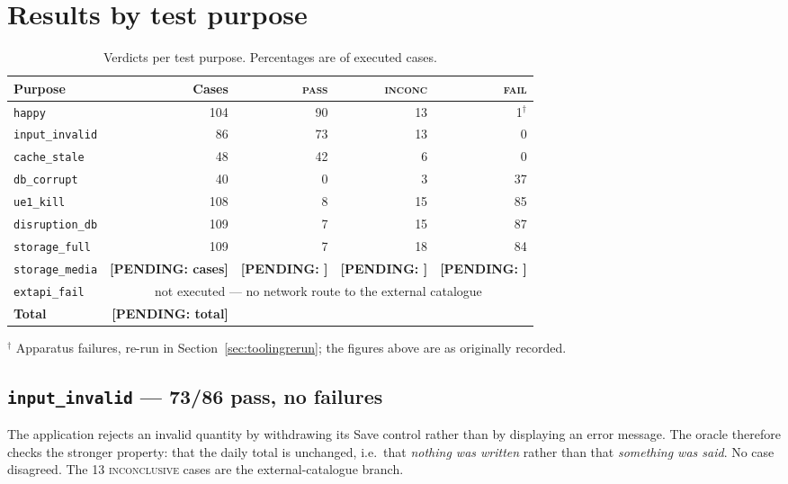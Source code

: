 \documentclass[11pt,a4paper]{article}
\newcommand{\PENDING}[1]{\textcolor{warn}{\textbf{[PENDING: #1]}}}
\newcommand{\gate}[1]{\texttt{\small #1}}
\begin{document}
\section{Results by test purpose}
\label{sec:results}

\begin{table}[h]
\centering\small
\caption{Verdicts per test purpose. Percentages are of executed cases.}
\label{tab:results}
\begin{tabular}{@{}lrrrr@{}}
\toprule
Purpose & Cases & \textsc{pass} & \textsc{inconc} & \textsc{fail} \\
\midrule
\gate{happy}          & 104 & 90 & 13 & 1$^{\dagger}$ \\
\gate{input\_invalid} &  86 & 73 & 13 & 0 \\
\gate{cache\_stale}   &  48 & 42 &  6 & 0 \\
\gate{db\_corrupt}    &  40 &  0 &  3 & 37 \\
\gate{ue1\_kill}      & 108 &  8 & 15 & 85 \\
\gate{disruption\_db} & 109 &  7 & 15 & 87 \\
\gate{storage\_full}  & 109 &  7 & 18 & 84 \\
\gate{storage\_media} & \PENDING{cases} & \PENDING{} & \PENDING{} & \PENDING{} \\
\gate{extapi\_fail}   & \multicolumn{4}{c}{not executed --- no network route to the external catalogue} \\
\midrule
\textbf{Total}        & \PENDING{total} & & & \\
\bottomrule
\end{tabular}
\end{table}

\noindent $^{\dagger}$ Apparatus failures, re-run in
Section~\ref{sec:toolingrerun}; the figures above are as originally recorded.

\subsection{\gate{input\_invalid} --- 73/86 pass, no failures}
The application rejects an invalid quantity by withdrawing its Save control
rather than by displaying an error message. The oracle therefore checks the
stronger property: that the daily total is unchanged, i.e.\ that \emph{nothing
was written} rather than that \emph{something was said}. No case disagreed. The
13 \textsc{inconclusive} cases are the external-catalogue branch.
\end{document}
